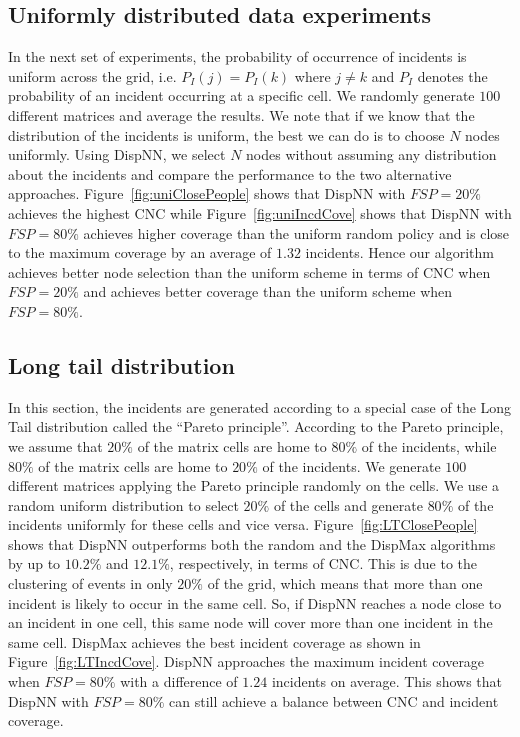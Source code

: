\documentclass{acm_proc_article-sp}
\begin{document}
\subsection{Uniformly distributed data experiments}
In the next set of experiments, the probability of occurrence of incidents is uniform across the grid, i.e. $P_I (j) = P_I (k)$ where $j \neq k$ and $P_I$ denotes the probability of an incident occurring at a specific cell. We randomly generate $100$ different matrices and average the results. We note that if we know that the distribution of the incidents is uniform, the best we can do is to choose $N$ nodes uniformly. Using DispNN, we select $N$ nodes without assuming any distribution about the incidents and compare the performance to the two alternative approaches. Figure~\ref{fig:uniClosePeople} shows that DispNN with $FSP = 20\%$ achieves the highest CNC while Figure~\ref{fig:uniIncdCove} shows that DispNN with $FSP = 80\%$ achieves higher coverage than the uniform random policy and is close to the maximum coverage by an average of $1.32$ incidents. Hence our algorithm achieves better node selection than the uniform scheme in terms of CNC when $FSP = 20\%$ and achieves better coverage than the uniform scheme when $FSP = 80\%$.

\subsection{Long tail distribution}
In this section, the incidents are generated according to a special case of the Long Tail distribution called the ``Pareto principle''. According to the Pareto principle, we assume that $20\%$ of the matrix cells are home to $80\%$ of the incidents, while $80\%$ of the matrix cells are home to $20\%$ of the incidents. We generate $100$ different matrices applying the Pareto principle randomly on the cells. We use a random uniform distribution to select $20\%$ of the cells and generate $80\%$ of the incidents uniformly for these cells and vice versa. Figure~\ref{fig:LTClosePeople} shows that DispNN outperforms both the random and the DispMax algorithms by up to $10.2\%$ and $12.1\%$, respectively, in terms of CNC. This is due to the clustering of events in only $20\%$ of the grid, which means that more than one incident is likely to occur in the same cell. So, if DispNN reaches a node close to an incident in one cell, this same node will cover more than one incident in the same cell. DispMax achieves the best incident coverage as shown in Figure~\ref{fig:LTIncdCove}. DispNN approaches the maximum incident coverage when $FSP = 80\%$ with a difference of $1.24$ incidents on average. This shows that DispNN with $FSP = 80\%$ can still achieve a balance between CNC and incident coverage.
\end{document}
